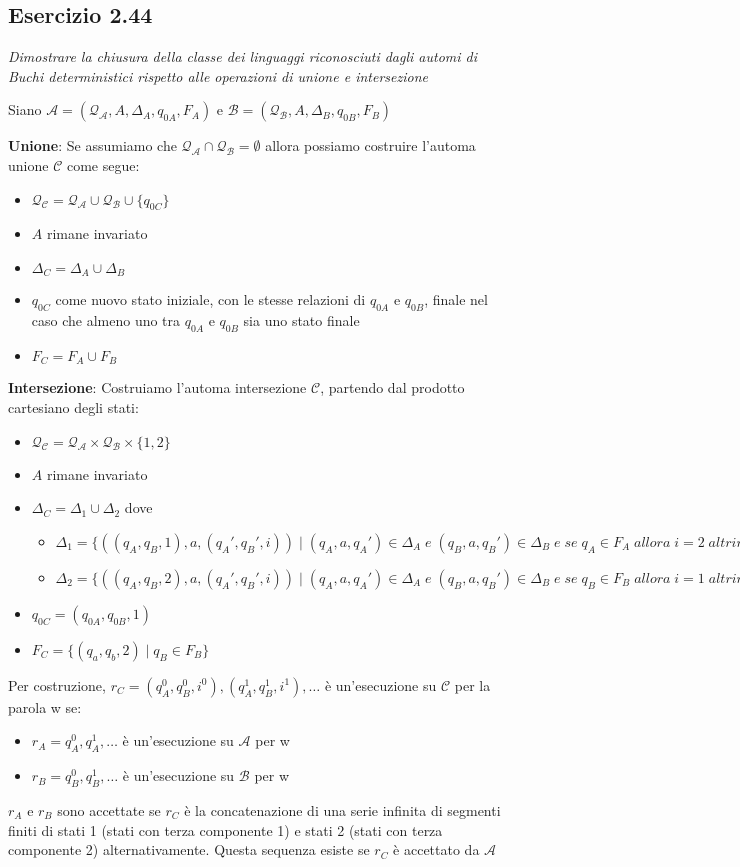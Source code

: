 \documentclass[12pt]{article}
\begin{document}
\subsection*{Esercizio 2.44}
\textit{Dimostrare la chiusura della classe dei linguaggi riconosciuti dagli automi di Buchi deterministici rispetto alle operazioni di unione e intersezione}

Siano $\mathcal{A} = (\mathcal{Q_A},A,\Delta_A,q_{0A},F_A)$ e $\mathcal{B} = (\mathcal{Q_B},A,\Delta_B,q_{0B},F_B)$

\textbf{Unione}: Se assumiamo che $ \mathcal{Q_A} \cap \mathcal{Q_B} = \emptyset$ allora possiamo costruire l'automa unione $\mathcal{C}$ come segue:
\begin{itemize}
	\item $\mathcal{Q_C} = \mathcal{Q_A} \cup \mathcal{Q_B} \cup \{q_{0C}\}$
	\item $A$ rimane invariato
	\item $\Delta_C = \Delta_A \cup \Delta_B$
	\item $q_{0C}$ come nuovo stato iniziale, con le stesse relazioni di $q_{0A}$ e $q_{0B}$, finale nel caso che almeno uno tra $q_{0A}$ e $q_{0B}$ sia uno stato finale
	\item $F_C = F_A \cup F_B$
\end{itemize}
\textbf{Intersezione}: Costruiamo l'automa intersezione $\mathcal{C}$, partendo dal prodotto cartesiano degli stati:
\begin{itemize}
	\item $\mathcal{Q_C} = \mathcal{Q_A} \times \mathcal{Q_B} \times \{1,2\}$
	\item $A$ rimane invariato
	\item $\Delta_C = \Delta_1 \cup \Delta_2$ dove
	\begin{itemize}
		\item $\Delta_1 = \{ ((q_A,q_B,1),a,(q_{A}',q_{B}',i)) \; | \; (q_A,a,q_A') \in \Delta_A\;e\;(q_B,a,q_B') \in \Delta_B\;e\;se\;q_A\in F_A\;allora\;i=2\;altrimenti\;i=1\}$
		\item $\Delta_2 = \{ ((q_A,q_B,2),a,(q_{A}',q_{B}',i)) \; | \; (q_A,a,q_A') \in \Delta_A\;e\;(q_B,a,q_B') \in \Delta_B\;e\;se\;q_B\in F_B\;allora\;i=1\;altrimenti\;i=2\}$
	\end{itemize}
	\item $q_{0C} = (q_{0A},q_{0B},1)$
	\item $F_C = \{(q_a,q_b,2)\;|\;q_B \in F_B\}$
\end{itemize}
Per costruzione, $r_C=(q_{A}^0,q_{B}^0,i^0),(q_{A}^1,q_{B}^1,i^1),\ldots$ è un'esecuzione su $\mathcal{C}$ per la parola w se:
\begin{itemize}
	\item $r_A=q_{A}^0,q_{A}^1,\ldots$ è un'esecuzione su $\mathcal{A}$ per w
	\item $r_B=q_{B}^0,q_{B}^1,\ldots$ è un'esecuzione su $\mathcal{B}$ per w
\end{itemize}
$r_A$ e $r_B$ sono accettate se $r_C$ è la concatenazione di una serie infinita di segmenti finiti di stati 1 (stati con terza componente 1) e stati 2 (stati con terza componente 2) alternativamente. Questa sequenza esiste se $r_C$ è accettato da $\mathcal{A}$ 
\end{document}
